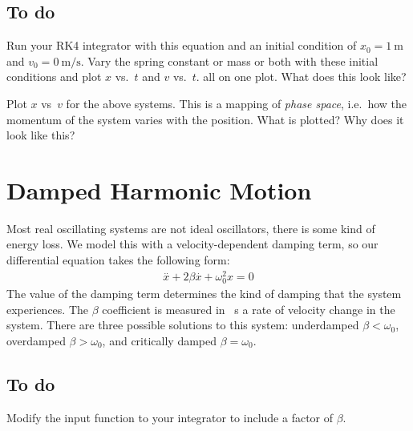 \documentclass[]{article}
\renewcommand{\dot}[1]{\overset{\bm{.}}{#1}{}}
\renewcommand{\ddot}[1]{\overset{\bm{..}}{#1}{}}
\renewcommand{\_}{\char`_}
\begin{document}
\subsection{To do}
\bbq
\bq Run your RK4 integrator with this equation and an initial condition of $x_0=\SI{1}{\meter}$ and $v_0=\SI{0}{\meter\per\second}$. Vary the spring constant or mass or both with these initial conditions and plot $x$ vs.\ $t$ and $v$ vs.\ $t$. all on one plot. What does this look like? 

\medskip\makebox[0.96\textwidth]{\hrulefill}

\medskip\makebox[0.96\textwidth]{\hrulefill}

\medskip\makebox[0.96\textwidth]{\hrulefill}
\eq

\bq Plot $x$ vs\ $v$ for the above systems. This is a mapping of \textit{phase space}, i.e.\ how the momentum of the system varies with the position. What is plotted? Why does it look like this?

\medskip\makebox[0.96\textwidth]{\hrulefill}

\medskip\makebox[0.96\textwidth]{\hrulefill}

\medskip\makebox[0.96\textwidth]{\hrulefill}
\eq


\eeq

\newpage

\section{Damped Harmonic Motion}

Most real oscillating systems are not ideal oscillators, there is some kind of energy loss. We model this with a velocity-dependent damping term, so our differential equation takes the following form:  
\begin{align*}
\ddot{x} + 2\beta\dot{x}+\omega_0^2x=0
\end{align*}
The value of the damping term determines the kind of damping that the system experiences. The $\beta$ coefficient is measured in \si{\per\second} a rate of velocity change in the system. There are three possible solutions to this system: underdamped $\beta<\omega_0$, overdamped $\beta>\omega_0$, and critically damped $\beta=\omega_0$. 

\subsection{To do}
\bbq
\bq Modify the input function to your integrator to include a factor of $\beta$.  
\eq
\end{document}
